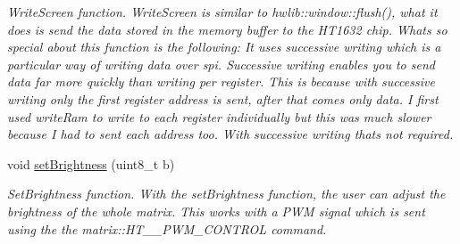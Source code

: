 \begin{DoxyCompactItemize}
\begin{DoxyCompactList}\small\item\em Write\+Screen function. Write\+Screen is similar to hwlib\+::window\+::flush(), what it does is send the data stored in the memory buffer to the H\+T1632 chip. What\textquotesingle{}s so special about this function is the following\+: It uses \textquotesingle{}successive writing\textquotesingle{} which is a particular way of writing data over spi. Successive writing enables you to send data far more quickly than writing per register. This is because with successive writing only the first register address is sent, after that comes only data. I first used write\+Ram to write to each register individually but this was much slower because I had to sent each address too. With successive writing that\textquotesingle{}s not required. \end{DoxyCompactList}\item 
void \hyperlink{group___h_t__1632_ga942af7e6d95cc5d44778cb5ba2f56b36}{set\+Brightness} (uint8\+\_\+t b)
\begin{DoxyCompactList}\small\item\em Set\+Brightness function. With the set\+Brightness function, the user can adjust the brightness of the whole matrix. This works with a P\+WM signal which is sent using the the matrix\+::\+H\+T\+\_\+\_\+\+P\+W\+M\+\_\+\+C\+O\+N\+T\+R\+OL command. \end{DoxyCompactList}\end{DoxyCompactItemize}
